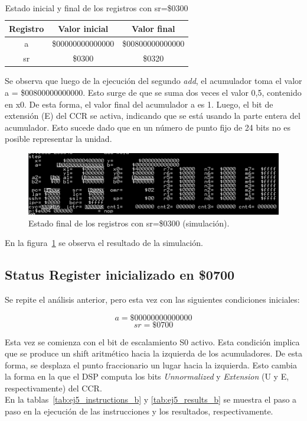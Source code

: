 \begin{table}[H]
\centering
\begin{tabular}{|c|c|c|}
\hline
\textbf{Registro} & \textbf{Valor inicial} & \textbf{Valor final} \\ \hline
a                 & \$00000000000000       & \$00800000000000     \\ \hline
sr                & \$0300                 & \$0320               \\ \hline
\end{tabular}
\caption{Estado inicial y final de los registros con sr=\$0300}
\label{tab:ej5_results_a}
\end{table}

Se observa que luego de la ejecución del segundo \textit{add}, el acumulador toma el valor a = \$00800000000000. Esto surge de que se suma dos veces el valor 0,5, contenido en x0. De esta forma, el valor final del acumulador a es 1. Luego, el bit de extensión (E) del CCR se activa, indicando que se está usando la parte entera del acumulador. Esto sucede dado que en un número de punto fijo de 24 bits no es posible representar la unidad.


\begin{figure}[H]
    \centering
    \includegraphics[width=\textwidth]{figs/ej5/ej5_3_a.png}
    \caption{Estado final de los registros con sr=\$0300 (simulación).}
    \label{fig:ej5_simregs_a}
\end{figure}

En la figura~\ref{fig:ej5_simregs_a} se observa el resultado de la simulación.


\subsection{Status Register inicializado en \$0700}
Se repite el análisis anterior, pero esta vez con las siguientes condiciones iniciales:

$$ a = \$00000000000000 $$
$$ sr = \$0700 $$

Esta vez se comienza con el bit de escalamiento S0 activo. Esta condición implica que se produce un shift aritmético hacia la izquierda de los acumuladores. De esta forma, se desplaza el punto fraccionario un lugar hacia la izquierda. Esto cambia la forma en la que el DSP computa los bits \textit{Unnormalized} y \textit{Extension} (U y E, respectivamente) del CCR.
\\
En la tablas~\ref{tab:ej5_instructions_b} y \ref{tab:ej5_results_b} se muestra el paso a paso en la ejecución de las instrucciones y los resultados, respectivamente.

